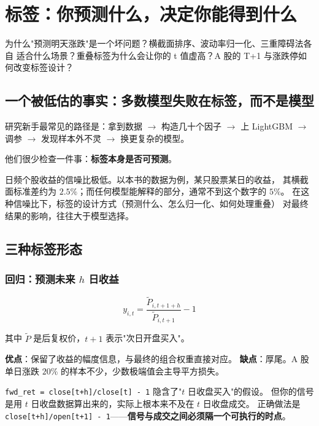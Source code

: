 \chapter{标签：你预测什么，决定你能得到什么}\label{ch:label}

\begin{keybox}[本章要回答的问题]
为什么"预测明天涨跌"是一个坏问题？横截面排序、波动率归一化、三重障碍法各自
适合什么场景？重叠标签为什么会让你的 t 值虚高？A 股的 T+1 与涨跌停如何改变标签设计？
\end{keybox}

\section{一个被低估的事实：多数模型失败在标签，而不是模型}

研究新手最常见的路径是：拿到数据 $\rightarrow$ 构造几十个因子 $\rightarrow$ 上 LightGBM $\rightarrow$ 调参 $\rightarrow$
发现样本外不灵 $\rightarrow$ 换更复杂的模型。

他们很少检查一件事：\textbf{标签本身是否可预测}。

日频个股收益的信噪比极低。以本书的数据为例，某只股票某日的收益，
其横截面标准差约为 $2.5\%$；而任何模型能解释的部分，通常不到这个数字的 $5\%$。
在这种信噪比下，标签的设计方式（预测什么、怎么归一化、如何处理重叠）
对最终结果的影响，往往大于模型选择。

\section{三种标签形态}

\subsection{回归：预测未来 $h$ 日收益}

\begin{equation}
  y_{i,t} = \frac{\tilde P_{i,t+1+h}}{\tilde P_{i,t+1}} - 1
  \label{eq:label-ret}
\end{equation}

其中 $\tilde P$ 是后复权价，$t+1$ 表示"次日开盘买入"。

\textbf{优点}：保留了收益的幅度信息，与最终的组合权重直接对应。
\textbf{缺点}：厚尾。A 股单日涨跌 $20\%$ 的样本不少，少数极端值会主导平方损失。

\begin{warnbox}
\texttt{fwd\_ret = close[t+h]/close[t] - 1} 隐含了"$t$ 日收盘买入"的假设。
但你的信号是用 $t$ 日收盘数据算出来的，实际上根本来不及在 $t$ 日收盘成交。
正确做法是 \texttt{close[t+h]/open[t+1] - 1}——\textbf{信号与成交之间必须隔一个可执行的时点}。
\end{warnbox}

